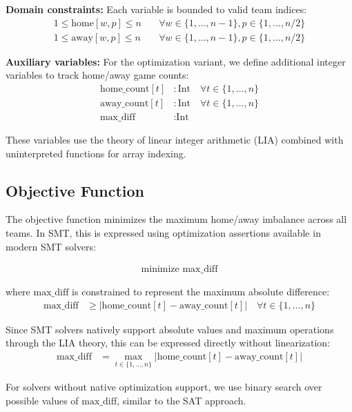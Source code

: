 \documentclass[11pt]{article}
\begin{document}
\textbf{Domain constraints:} Each variable is bounded to valid team indices:
\begin{align}
1 \leq \text{home}[w,p] \leq n \quad &\forall w \in \{1, \ldots, n-1\}, p \in \{1, \ldots, n/2\} \\
1 \leq \text{away}[w,p] \leq n \quad &\forall w \in \{1, \ldots, n-1\}, p \in \{1, \ldots, n/2\}
\end{align}

\textbf{Auxiliary variables:} For the optimization variant, we define additional integer variables to track home/away game counts:
\begin{align}
\text{home\_count}[t] &: \text{Int} \quad \forall t \in \{1, \ldots, n\} \\
\text{away\_count}[t] &: \text{Int} \quad \forall t \in \{1, \ldots, n\} \\
\text{max\_diff} &: \text{Int}
\end{align}

These variables use the theory of linear integer arithmetic (LIA) combined with uninterpreted functions for array indexing.

\subsection{Objective Function}

The objective function minimizes the maximum home/away imbalance across all teams. In SMT, this is expressed using optimization assertions available in modern SMT solvers:

\begin{align}
\text{minimize } \text{max\_diff}
\end{align}

where $\text{max\_diff}$ is constrained to represent the maximum absolute difference:
\begin{align}
\text{max\_diff} &\geq |\text{home\_count}[t] - \text{away\_count}[t]| \quad \forall t \in \{1, \ldots, n\}
\end{align}

Since SMT solvers natively support absolute values and maximum operations through the LIA theory, this can be expressed directly without linearization:
\begin{align}
\text{max\_diff} &= \max_{t \in \{1,\ldots,n\}} |\text{home\_count}[t] - \text{away\_count}[t]|
\end{align}

For solvers without native optimization support, we use binary search over possible values of $\text{max\_diff}$, similar to the SAT approach.
\end{document}
